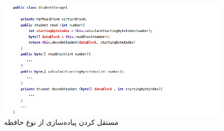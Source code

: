 \begin{flushright}
    \begin{figure}[H]
        \centering
        \includegraphics[scale=0.6]{source/student-storage-model-2}
        \caption{مستقل کردن پیاده‌سازی از نوع حافظه}
        \label{fig:student-storage-model-2}
    \end{figure}


\end{flushright}
